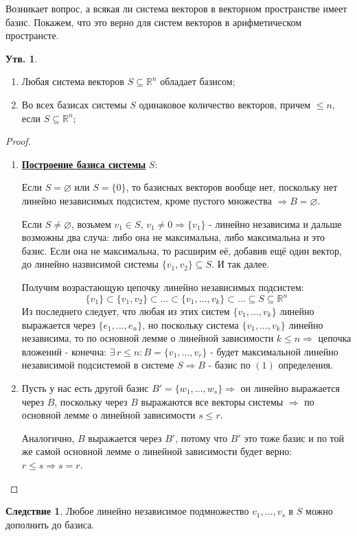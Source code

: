 \documentclass[12pt]{article}
\newcommand{\MR}{\mathbb{R}}
\newcommand{\VN}{\varnothing}
\theoremstyle{definition}
\newtheorem{prop}{Утв.}
\newtheorem{corollary}{Следствие}
\begin{document}
Возникает вопрос, а всякая ли система векторов в векторном пространстве имеет базис. Покажем, что это верно для систем векторов в арифметическом пространсте.
\begin{prop}
	\hfill
	\begin{enumerate}[label=\arabic*)]
		\item Любая система векторов $S \subseteq \MR^n$ обладает базисом;
		\item Во всех базисах системы $S$ одинаковое количество векторов, причем $\leq n$, если  $S \subseteq \MR^n$;
	\end{enumerate}
\end{prop}
\begin{proof}\hfill
	\begin{enumerate}[label=\arabic*)]
		\item \uline{\textbf{Построение базиса системы}} $S$: 
		
		Если $S = \VN$ или $S = \{0\}$, то базисных векторов вообще нет, поскольку нет линейно независимых подсистем, кроме пустого множества $\Rightarrow B = \VN$.
		
		Если $S \neq \VN$, возьмем $v_1 \in S, \, v_1 \neq 0 \Rightarrow \{v_1\}$ - линейно независима и дальше возможны два случа: либо она не максимальна, либо максимальна и это базис. Если она не максимальна, то расширим её, добавив ещё один вектор, до линейно назвисимой системы $\{v_1,v_2\} \subseteq S$. И так далее. 
		
		Получим возрастающую цепочку линейно независимых подсистем:
		$$
			\{v_1\} \subset \{v_1,v_2\} \subset \dotsc \subset \{v_1 ,\dotsc, v_k\} \subset \dotsc \subseteq S \subseteq \MR^n
		$$
		Из последнего следует, что любая из этих систем $\{v_1, \dotsc, v_k\}$ линейно выражается через $\{e_1, \dotsc, e_n\}$, но поскольку система $\{v_1,\dotsc,v_k\}$ линейно независима, то по основной лемме о линейной зависимости $k \leq n \Rightarrow$ цепочка вложений - конечна: $\exists \, r \leq n \colon B = \{v_1, \dotsc, v_r\}$ - будет максимальной линейно независимой подсистемой в системе $S \Rightarrow B$ - базис по $(1)$ определения.
 		
 		\item Пусть у нас есть другой базис $B' =\{w_1,\dotsc, w_s\} \Rightarrow$ он линейно выражается через $B$, поскольку через $B$ выражаются все векторы системы $\Rightarrow$ по основной лемме о линейной зависимости $s \leq r$. 
 		
 		Аналогично, $B$ выражается через $B'$, потому что $B'$ это тоже базис и по той же самой основной лемме о линейной зависимости будет верно: $r \leq s \Rightarrow s = r$.
 	\end{enumerate}
\end{proof}
\begin{corollary}
	Любое линейно независимое подмножество $v_1, \dotsc, v_s$ в $S$ можно дополнить до базиса.
\end{corollary}
\end{document}
